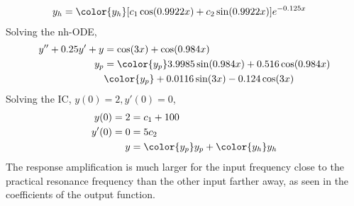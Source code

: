 \begin{enumerate}
\begin{enumerate}
\begin{align}
                        y_{h} & = \color{y_h} [c_{1}\cos(0.9922x)
                            + c_{2}\sin(0.9922x)]e^{-0.125x}
                    \end{align}
                    Solving the nh-ODE,
                    \begin{align}
                        y'' + 0.25y' + y & = \cos(3x) + \cos(0.984x)         \\
                        y_{p}            & = \color{y_p} 3.9985 \sin(0.984x)
                        + 0.516 \cos(0.984x)                                 \\
                                         & \color{y_p} + 0.0116 \sin(3x)
                        - 0.124\cos(3x)
                    \end{align}
                    Solving the IC, $ y(0) = 2, y'(0) = 0 $,
                    \begin{align}
                        y(0) = 2  & = c_{1} + 100                               \\
                        y'(0) = 0 & = 5c_{2}                                    \\
                        y         & = {\color{y_p} y_{p}} + {\color{y_h} y_{h}}
                    \end{align}
                    The response amplification is much larger for the input frequency
                    close to the practical resonance frequency than the other input
                    farther away, as seen in the coefficients of the output function.


\end{enumerate}
\end{enumerate}
